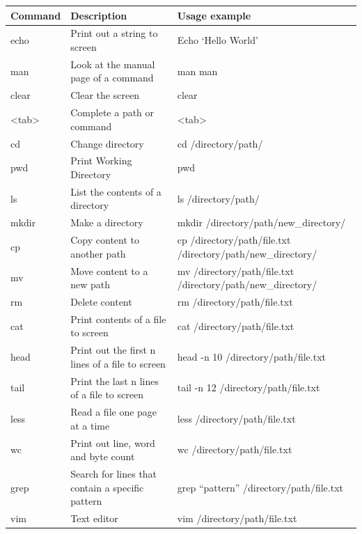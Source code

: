 \documentclass[
  letterpaper,
  DIV=11,
  numbers=noendperiod]{scrreprt}
\newcounter{none} %
\begin{document}
{\def\LTcaptype{none} %
\begin{longtable}[]{@{}
  >{\raggedright\arraybackslash}p{}
  >{\raggedright\arraybackslash}p{}
  >{\raggedright\arraybackslash}p{}@{}}
\toprule\noalign{}
\begin{minipage}[b]{\linewidth}\raggedright
\textbf{Command}
\end{minipage} & \begin{minipage}[b]{\linewidth}\raggedright
\textbf{Description}
\end{minipage} & \begin{minipage}[b]{\linewidth}\raggedright
\textbf{Usage example}
\end{minipage} \\
\midrule\noalign{}
\endhead
\bottomrule\noalign{}
\endlastfoot
echo & Print out a string to screen & Echo `Hello World' \\
man & Look at the manual page of a command & man man \\
clear & Clear the screen & clear \\
\textless tab\textgreater{} & Complete a path or command &
\textless tab\textgreater{} \\
cd & Change directory & cd /directory/path/ \\
pwd & Print Working Directory & pwd \\
ls & List the contents of a directory & ls /directory/path/ \\
mkdir & Make a directory & mkdir /directory/path/new\_directory/ \\
cp & Copy content to another path & cp /directory/path/file.txt
/directory/path/new\_directory/ \\
mv & Move content to a new path & mv /directory/path/file.txt
/directory/path/new\_directory/ \\
rm & Delete content & rm /directory/path/file.txt \\
cat & Print contents of a file to screen & cat
/directory/path/file.txt \\
head & Print out the first n lines of a file to screen & head -n 10
/directory/path/file.txt \\
tail & Print the last n lines of a file to screen & tail -n 12
/directory/path/file.txt \\
less & Read a file one page at a time & less /directory/path/file.txt \\
wc & Print out line, word and byte count & wc
/directory/path/file.txt \\
grep & Search for lines that contain a specific pattern & grep
``pattern'' /directory/path/file.txt \\
vim & Text editor & vim /directory/path/file.txt \\
\end{longtable}
}
\end{document}
